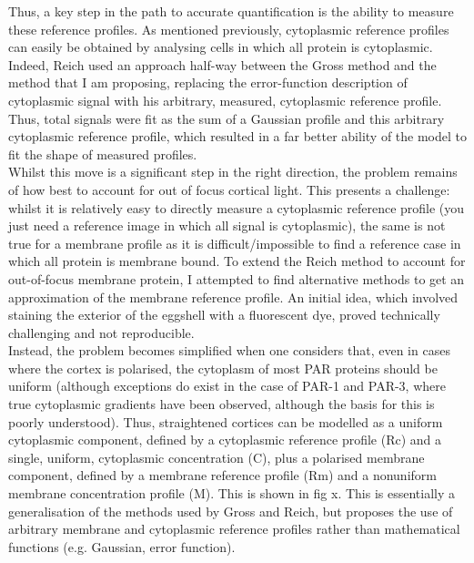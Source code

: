 \documentclass[12pt]{"article"}
\begin{document}
Thus, a key step in the path to accurate quantification is the ability to measure these reference profiles. As mentioned previously, cytoplasmic reference profiles can easily be obtained by analysing cells in which all protein is cytoplasmic. Indeed, Reich used an approach half-way between the Gross method and the method that I am proposing, replacing the error-function description of cytoplasmic signal with his arbitrary, measured, cytoplasmic reference profile. Thus, total signals were fit as the sum of a Gaussian profile and this arbitrary cytoplasmic reference profile, which resulted in a far better ability of the model to fit the shape of measured profiles.\\

Whilst this move is a significant step in the right direction, the problem remains of how best to account for out of focus cortical light. This presents a challenge: whilst it is relatively easy to directly measure a cytoplasmic reference profile (you just need a reference image in which all signal is cytoplasmic), the same is not true for a membrane profile as it is difficult/impossible to find a reference case in which all protein is membrane bound. To extend the Reich method to account for out-of-focus membrane protein, I attempted to find alternative methods to get an approximation of the membrane reference profile. An initial idea, which involved staining the exterior of the eggshell with a fluorescent dye, proved technically challenging and not reproducible.\\

Instead, the problem becomes simplified when one considers that, even in cases where the cortex is polarised, the cytoplasm of most PAR proteins should be uniform (although exceptions do exist in the case of PAR-1 and PAR-3, where true cytoplasmic gradients have been observed, although the basis for this is poorly understood). Thus, straightened cortices can be modelled as a uniform cytoplasmic component, defined by a cytoplasmic reference profile (Rc) and a single, uniform, cytoplasmic concentration (C), plus a polarised membrane component, defined by a membrane reference profile (Rm) and a nonuniform membrane concentration profile (M). This is shown in fig x. This is essentially a generalisation of the methods used by Gross and Reich, but proposes the use of arbitrary membrane and cytoplasmic reference profiles rather than mathematical functions (e.g. Gaussian, error function).\\
\end{document}
